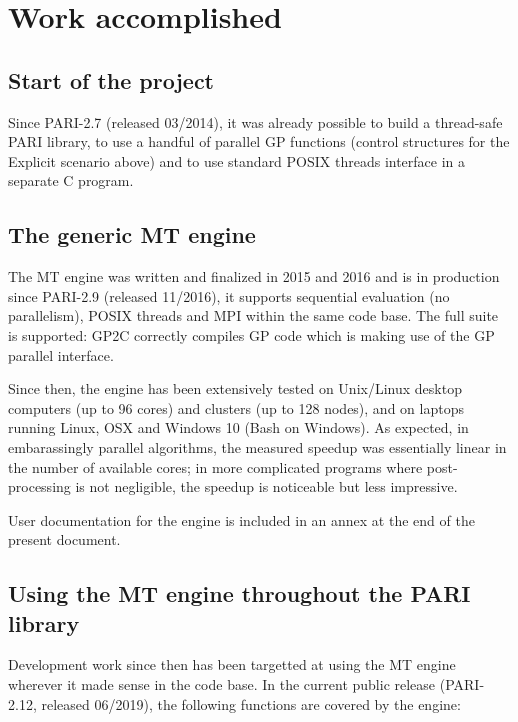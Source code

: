 \documentclass{deliverablereport}
\begin{document}
\section{Work accomplished}
\subsection{Start of the project}
Since PARI-2.7 (released 03/2014), it was already possible to build a
thread-safe PARI library, to use a handful of parallel GP functions
(control structures for the Explicit scenario above) and to use standard
POSIX threads interface in a separate C program.

\subsection{The generic MT engine}
The MT engine was written and finalized in 2015 and 2016 and is in
production since PARI-2.9 (released 11/2016), it supports sequential
evaluation (no parallelism), POSIX threads and MPI within the same code
base. The full suite is supported: GP2C correctly compiles GP code which is
making use of the GP parallel interface.

Since then, the engine has been extensively tested on Unix/Linux
desktop computers (up to 96 cores) and clusters (up to 128 nodes), and on
laptops running Linux, OSX and Windows 10 (Bash on Windows). As expected, in
embarassingly parallel algorithms, the measured speedup was essentially
linear in the number of available cores; in more complicated programs where
post-processing is not negligible, the speedup is noticeable but less
impressive.

User documentation for the engine is included in an annex at the end of the
present document.

\subsection{Using the MT engine throughout the PARI library}
Development work since then has been targetted at using the MT engine
wherever it made sense in the \Pari code base. In the current public release
(PARI-2.12, released 06/2019), the following functions are covered by the
engine:
\end{document}
